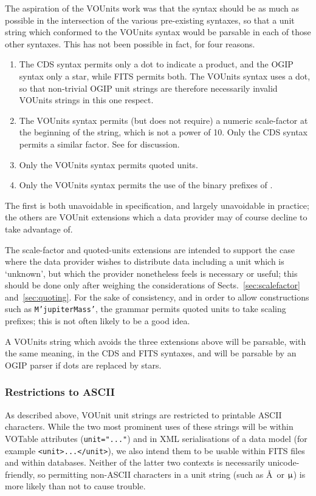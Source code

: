 \documentclass[11pt,a4paper]{ivoa}
\def\micro{{\ensuremath \mu}}
\def\micro{{\ensuremath \upmu}}
\begin{document}
The aspiration of the VOUnits work was that the syntax should be as
much as possible in the intersection of the various pre-existing
syntaxes, so that a unit string which conformed to the VOUnits syntax
would be parsable in each of those other syntaxes.  This has not been
possible in fact, for four reasons.
\begin{enumerate}
\item The CDS syntax permits only a dot to indicate a product, and the
OGIP syntax only a star, while FITS permits both.  The VOUnits syntax
uses a dot, so that non-trivial OGIP unit strings are therefore
necessarily invalid VOUnits strings in this one respect.
\item The VOUnits syntax permits (but does not require) a numeric scale-factor
at the beginning of the string, which is not a power of 10.  Only the
CDS syntax permits a similar factor.
See  for discussion.
\item Only the VOUnits syntax permits quoted units.
\item Only the VOUnits syntax permits the use of the binary prefixes
of .
\end{enumerate}
The first is both unavoidable in specification, and largely
unavoidable in practice; the others are VOUnit extensions which a data
provider may of course decline to take advantage of.

The scale-factor and quoted-units extensions are intended to support
the case where the data provider wishes to distribute data including a
unit which is `unknown', but which the provider nonetheless feels is
necessary or useful; this should be done only after weighing the
considerations of Sects.~\ref{sec:scalefactor} and~\ref{sec:quoting}.
For the sake of consistency, and in order to allow
constructions such as \texttt{M'jupiterMass'}, the grammar permits quoted
units to take scaling prefixes; this is not often likely to be a good idea.

A VOUnits string which avoids the three extensions above will be
parsable, with the same meaning, in the CDS and FITS syntaxes, and
will be parsable by an OGIP parser if dots are replaced by stars.

\subsubsection{Restrictions to ASCII}

As described above, VOUnit unit strings are restricted to printable
ASCII characters.  While the two most prominent uses of these strings
will be within VOTable attributes (\verb|unit="..."|) and in XML
serialisations of a data model (for example \verb|<unit>...</unit>|),
we also intend them to be usable within FITS files and within
databases.  Neither of the latter two contexts is necessarily
unicode-friendly, so permitting non-ASCII characters in a unit string
(such as \AA\ or $\micro$) is more likely than not to cause trouble.
\end{document}
